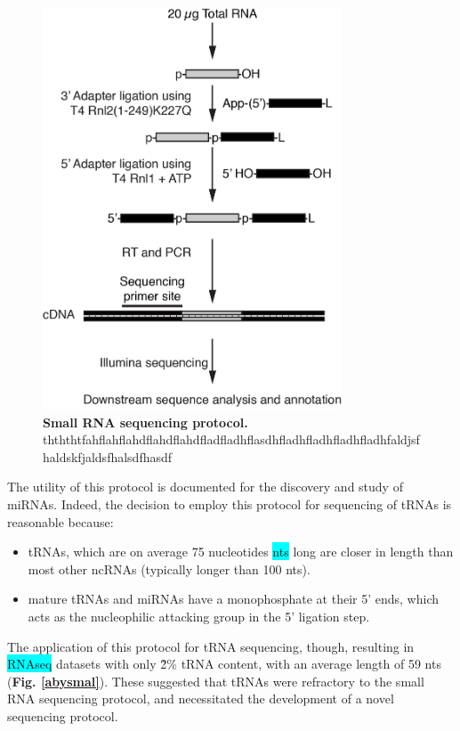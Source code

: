 \documentclass[12pt]{rockefeller}
\newcommand{\cyan}[1]{\colorbox{cyan}{#1}}
\begin{document}
\begin{figure}[!ht]%
\centering
\includegraphics[width=3.5in]{sRNA.png}%
\caption[tRNA biogensis]{\textbf{Small RNA sequencing protocol.} thththtfahflahflahdflahdflahdfladfladhflasdhfladhfladhfladhfladhfaldjsfhaldskfjaldsfhalsdfhasdf}
\centering
\label{sRNA}%
\end{figure}

The utility of this protocol is documented for the discovery and study of miRNAs. Indeed, the decision to employ this protocol for sequencing of tRNAs is reasonable because:
\begin{itemize}
\item tRNAs, which are on average 75 nucleotides \cyan{nts} long are closer in length than most other ncRNAs (typically longer than 100 nts). 
\item mature tRNAs and miRNAs have a monophosphate at their 5' ends, which acts as the nucleophilic attacking group in the 5' ligation step. 
\end{itemize}
The application of this protocol for tRNA sequencing, though, resulting in \cyan{RNAseq} datasets with only \~2\% tRNA content, with an average length of 59 nts (\textbf{Fig. \ref{abysmal}}). These suggested that tRNAs were refractory to the small RNA sequencing protocol, and necessitated the development of a novel sequencing protocol. 
\end{document}
